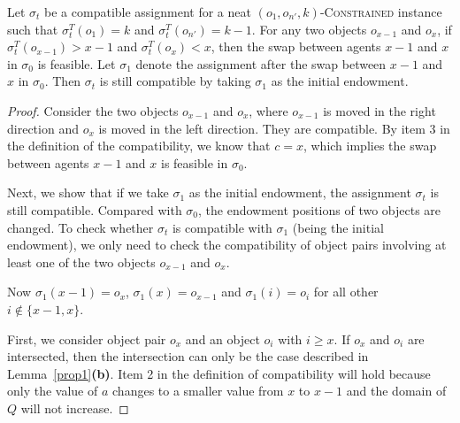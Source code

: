 \begin{lemma}\label{oneswap}
Let $\sigma _t$ be a compatible assignment for a neat $(o_1,o_{n'},k)$-\textsc{Constrained} instance
such that $\sigma^T_t(o_1)=k$ and $\sigma^T_t(o_{n'})=k-1$.
For any two objects $o_{x-1}$ and $o_x$, if $\sigma^T_t(o_{x-1})> x-1$ and $\sigma^T_t(o_{x})< x$, then the swap between agents $x-1$ and $x$ in $\sigma_0$ is feasible. Let $\sigma_1$ denote the assignment after the swap between $x-1$ and $x$ in $\sigma_0$.
Then $\sigma _t$ is still compatible by taking $\sigma _1$ as the initial endowment.
\end{lemma}
\begin{proof}
    Consider the two objects $o_{x-1}$ and $o_x$, where $o_{x-1}$ is moved  in the right direction and $o_x$ is moved in the left direction. They are compatible.
    By item 3 in the definition of the compatibility, we know that $c=x$, which implies the swap between agents $x-1$ and $x$ is feasible in $\sigma_0$.

    Next, we show that if we take $\sigma _1$ as the initial endowment, the assignment $\sigma _t$ is still compatible.
    Compared with $\sigma_0$, the endowment positions of two objects are changed.
    To check whether $\sigma _t$ is compatible with $\sigma _1$ (being the initial endowment),
    we only need to check the compatibility of object pairs involving at least one of the two objects $o_{x-1}$
    and $o_x$.

    Now $\sigma_1(x-1)=o_{x}$, $\sigma_1(x)=o_{x-1}$ and $\sigma_1(i)=o_{i}$ for all other $i\notin\{ x-1,x\}$.

    First, we consider object pair $o_{x}$ and an object $o_i$ with $ i \geq x$. If $o_{x}$ and $o_i$ are intersected, then the
    intersection can only be the case described in Lemma~\ref{prop1}\textbf{(b)}.
    Item 2 in the definition of compatibility will hold because only the value of $a$ changes to a smaller value from $x$ to $x-1$ and the domain of $Q$ will not increase.



\end{proof}
